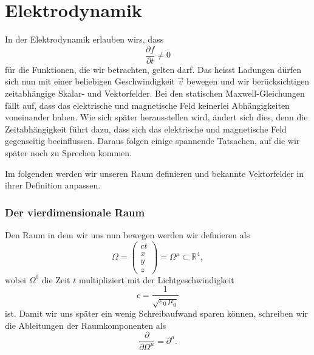 %
%
%
%
\section{Elektrodynamik\label{section:maxwell:elektrodynmaik}}
In der Elektrodynamik erlauben wirs, dass
\[
\frac{\partial f}{\partial t}
\neq
0
\]
für die Funktionen, die wir betrachten, gelten darf.
Das heisst Ladungen dürfen sich nun mit einer beliebigen Geschwindigkeit $\vec{v}$ bewegen und wir berücksichtigen zeitabhängige Skalar- und Vektorfelder.
Bei den statischen Maxwell-Gleichungen fällt auf, dass das elektrische und magnetische Feld keinerlei Abhängigkeiten voneinander haben.
Wie sich später herausstellen wird, ändert sich dies, denn die Zeitabhängigkeit führt dazu, dass sich das elektrische und magnetische Feld gegenseitig beeinflussen.
Daraus folgen einige spannende Tatsachen, auf die wir später noch zu Sprechen kommen.
 
Im folgenden werden wir unseren Raum definieren und bekannte Vektorfelder in ihrer Definition anpassen.

\subsubsection{Der vierdimensionale Raum}
Den Raum in dem wir uns nun bewegen werden wir definieren als
\begin{equation}
	\Omega
	=
	\begin{pmatrix}
		ct\\
		x\\
		y\\
		z
	\end{pmatrix}
	=
	\Omega^{\mu} \subset \mathbb{R}^4,
\end{equation}
wobei $\Omega^0$ die Zeit $t$ multipliziert mit der Lichtgeschwindigkeit
\[
c
=
\frac{1}{\sqrt{\varepsilon_0\,\mu_0}}
\]
ist.
Damit wir uns später ein wenig Schreibaufwand sparen können, schreiben wir die Ableitungen der Raumkomponenten als
\[
\frac{\partial}{\partial \Omega^{\mu}}
=
\partial^{\mu}.
\]

